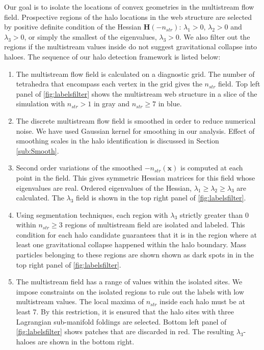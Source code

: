 {Our goal is to isolate the locations of convex geometries in the multistream flow field. Prospective regions of the halo locations in the web structure are selected by positive definite condition of the Hessian $\mathbf{H}(-n_{str})$: $\lambda_1 > 0$, $\lambda_2 > 0$ and  $\lambda_3 > 0$, or simply the smallest of the eigenvalues, $\lambda_3 > 0$. We also filter out the regions if the multistream values inside do not suggest gravitational collapse into haloes. The sequence of our halo detection framework is listed below: 


\begin{enumerate}
\item The multistream flow field is calculated on a diagnostic grid. The number of tetrahedra that encompass each vertex in the grid gives the $n_{str}$ field. Top left panel of \autoref{fig:labelsfilter} shows the multistream web structure in a slice of the simulation with $n_{str} > 1$ in gray and $n_{str} \geq 7$ in blue.  

\item The discrete multistream flow field is smoothed in order to reduce numerical noise. We have used Gaussian kernel for smoothing in our analysis. Effect of smoothing scales in the halo identification is discussed in Section \ref{sub:Smooth}. 

\item Second order variations of the smoothed $-n_{str}(\mathbf{x})$ is computed at each point in the field. This gives symmetric Hessian matrices for this field whose eigenvalues are real. Ordered eigenvalues of the Hessian, $ \lambda_1 \geq  \lambda_2 \geq \lambda_3$ are calculated. The $\lambda_3$ field is shown in the top right panel of \autoref{fig:labelsfilter}. 

\item Using segmentation techniques, each region with $ \lambda_3 $ strictly greater than $0$ within $n_{str} \geq 3$ regions of multistream field are isolated and labeled. This condition for each halo candidate guarantees that it is in the region where at least one gravitational collapse happened within the halo boundary. Mass particles belonging to these regions are shown shown as dark spots in in the top right panel of \autoref{fig:labelsfilter}. 

\item The multistream field has a range of values within the isolated sites. We impose constraints on the isolated regions to rule out the labels with low multistream values. The local maxima of $n_{str}$ inside each halo must be at least 7. By this restriction, it is ensured that the halo sites with three Lagrangian sub-manifold foldings are selected. Bottom left panel of \autoref{fig:labelsfilter} shows patches that are discarded in red. The resulting $\lambda_3$-haloes are shown in the bottom right.  
  


\end{enumerate}}
